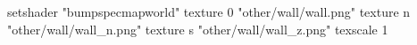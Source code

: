 setshader "bumpspecmapworld"
   texture 0 "other/wall/wall.png"
   texture n "other/wall/wall_n.png"
   texture s "other/wall/wall_z.png"
texscale 1